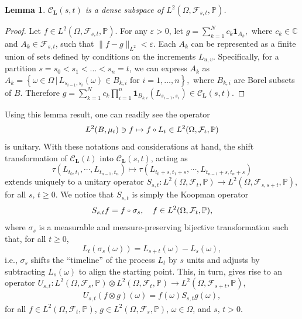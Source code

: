 \documentclass[11pt]{amsart}
\newtheorem{lemma}[theorem]{Lemma}
\theoremstyle{definition}
\theoremstyle{remark}
\numberwithin{equation}{section}
\newcommand{\m}{\mathcal }
\newcommand{\compcent}[1]{\vcenter{\hbox{$#1\circ$}}}
\newcommand{\comp}{\mathbin{\mathchoice
{\compcent\scriptstyle}{\compcent\scriptstyle}
{\compcent\scriptscriptstyle}{\compcent\scriptscriptstyle}}}
\begin{document}
\begin{lemma} $\m{C}_{\bm{L}}(s,t)$ is a dense subspace of $L^2(\Omega, \mathcal{F}_{s,t}, \mathbb{P})$. \end{lemma}
\begin{proof} Let \( f \in L^2(\Omega, \mathcal{F}_{s,t}, \mathbb{P}) \). For any \( \varepsilon > 0 \), let
\(
g = \sum_{k=1}^N c_k \mathbf{1}_{A_k},
\)
where \( c_k \in \mathbb{C} \) and \( A_k \in \mathcal{F}_{s,t} \), such that
\(
\| f - g \|_{L^2} < \varepsilon.
\) Each \( A_k \) can be represented as a finite union of sets defined by conditions on the increments \( L_{u,v} \). Specifically, for a partition \( s = s_0 < s_1 < \dots < s_n = t \), we can express \( A_k \) as
\(
A_k = \left\{ \omega \in \Omega\,|\, L_{s_{i-1}, s_i}(\omega) \in B_{k,i} \text{ for } i = 1, \dots, n \right\},
\)
where \( B_{k,i} \) are Borel subsets of \( B \). Therefore
\( g = \sum_{k=1}^N c_k \prod_{i=1}^n \mathbf{1}_{B_{k,i}}(L_{s_{i-1}, s_i})
\in \mathcal{C}_{\bm{L}}(s,t) \).
\end{proof}
Using this lemma result, one can readily see the operator \begin{align}\label{oper}
 L^2(B, \mu_t)\ni f \mapsto f\comp L_t\in L^2(\Omega, \mathcal{F}_t, \mathbb{P})\end{align} is unitary. With these notations and considerations at hand, the shift transformation of \(\m{C}_{\bm{L}}(t)\) into \(\m{C}_{\bm{L}}(s,t)\), acting as
\[
\tau(L_{t_0, t_1},\cdots,L_{t_{n-1},t_{n}} )\mapsto \tau(L_{t_0+s, t_1+s}, \cdots,L_{t_{n-1}+s, t_n+s} )
\] 
extends uniquely to a unitary operator \(S_{s,t}: L^2(\Omega, \mathcal{F}_t, \mathbb{P})\to L^2(\Omega, \mathcal{F}_{s, s+t}, \mathbb{P})\), for all \(s,\,t\geq 0\).  We notice that \(S_{s,t}\) is simply the Koopman operator 
\[
S_{s,t}f=f\comp \sigma_{s},\quad f\in  L^2(\Omega, \mathcal{F}_t, \mathbb{P}),
\]
 where \(\sigma_{s}\) is a measurable and measure-preserving bijective transformation such that, for all \(t\geq 0\), \[L_t(\sigma_s(\omega))=L_{s+t}(\omega)-L_s(\omega),\] i.e., \(\sigma_s\) shifts the ``timeline'' of the process \(L_t\) by \(s\) units and adjusts by subtracting \(L_s(\omega)\) to align the starting point. This, in turn, gives rise to an operator \(U_{s,t}:  L^2(\Omega, \mathcal{F}_s, \mathbb{P})\otimes  L^2(\Omega, \mathcal{F}_t, \mathbb{P})\to  L^2(\Omega, \mathcal{F}_{s+t}, \mathbb{P})\), \begin{eqnarray}\label{mult}
U_{s,t}(f\otimes g)(\omega)=f(\omega)S_{s,t}g(\omega),\end{eqnarray} for all \(f\in  L^2(\Omega, \mathcal{F}_t, \mathbb{P})\), $g\in  L^2(\Omega, \mathcal{F}_s, \mathbb{P})$, $\omega\in \Omega$, and $s,\,t>0$.
\end{document}
